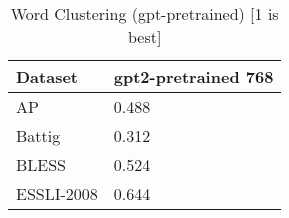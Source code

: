 \begin{table}[]
\centering
\begin{tabular}{l|l}
\hline
Dataset & gpt2-pretrained 768 \\
\hline
AP & 0.488 \\ 
Battig & 0.312 \\ 
BLESS & 0.524 \\ 
ESSLI-2008 & 0.644
\end{tabular}
\caption{Word Clustering (gpt-pretrained) [1 is best]}
\label{tab:cluster-gpt-pretrained}
\end{table}

